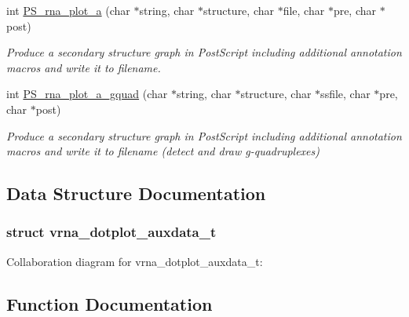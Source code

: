 \begin{DoxyCompactItemize}
int \mbox{\hyperlink{group__plotting__utils_ga47856b2504b566588785597b6ebb8271}{P\+S\+\_\+rna\+\_\+plot\+\_\+a}} (char $\ast$string, char $\ast$structure, char $\ast$file, char $\ast$pre, char $\ast$post)
\begin{DoxyCompactList}\small\item\em Produce a secondary structure graph in Post\+Script including additional annotation macros and write it to \textquotesingle{}filename\textquotesingle{}. \end{DoxyCompactList}\item 
int \mbox{\hyperlink{group__plotting__utils_ga32fa0f97625119e9d24dd2e7153abc4f}{P\+S\+\_\+rna\+\_\+plot\+\_\+a\+\_\+gquad}} (char $\ast$string, char $\ast$structure, char $\ast$ssfile, char $\ast$pre, char $\ast$post)
\begin{DoxyCompactList}\small\item\em Produce a secondary structure graph in Post\+Script including additional annotation macros and write it to \textquotesingle{}filename\textquotesingle{} (detect and draw g-\/quadruplexes) \end{DoxyCompactList}\end{DoxyCompactItemize}


\subsection{Data Structure Documentation}
\label{structvrna__dotplot__auxdata__t}
\subsubsection{struct vrna\+\_\+dotplot\+\_\+auxdata\+\_\+t}


Collaboration diagram for vrna\+\_\+dotplot\+\_\+auxdata\+\_\+t\+:


\subsection{Function Documentation}
\mbox{\label{group__plotting__utils_ga00ea223b5cf02eb2faae5ff29f0d5e12}} 

